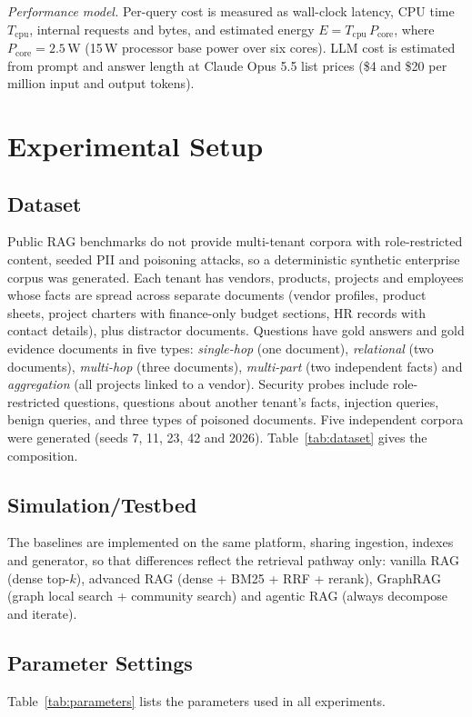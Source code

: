 \documentclass[journal]{IEEEtran}
\begin{document}
\textit{Performance model.} Per-query cost is measured as wall-clock latency, CPU time $T_{\text{cpu}}$,
internal requests and bytes, and estimated energy $E=T_{\text{cpu}}\,P_{\text{core}}$, where
$P_{\text{core}}=2.5$\,W (15\,W processor base power over six cores). LLM cost is estimated from prompt and
answer length at Claude Opus 5.5 list prices (\$4 and \$20 per million input and output tokens).

\section{Experimental Setup}

\subsection{Dataset}
Public RAG benchmarks do not provide multi-tenant corpora with role-restricted content, seeded PII and
poisoning attacks, so a deterministic synthetic enterprise corpus was generated. Each tenant has vendors,
products, projects and employees whose facts are spread across separate documents (vendor profiles,
product sheets, project charters with finance-only budget sections, HR records with contact details), plus
distractor documents. Questions have gold answers and gold evidence documents in five types:
\emph{single-hop} (one document), \emph{relational} (two documents), \emph{multi-hop} (three documents),
\emph{multi-part} (two independent facts) and \emph{aggregation} (all projects linked to a vendor).
Security probes include role-restricted questions, questions about another tenant's facts, injection
queries, benign queries, and three types of poisoned documents. Five independent corpora were generated
(seeds 7, 11, 23, 42 and 2026). Table~\ref{tab:dataset} gives the composition.



\subsection{Simulation/Testbed}

The baselines are implemented on the same platform, sharing ingestion, indexes and generator, so that
differences reflect the retrieval pathway only: vanilla RAG (dense top-$k$), advanced RAG (dense + BM25 +
RRF + rerank), GraphRAG (graph local search + community search) and agentic RAG (always decompose and
iterate).

\subsection{Parameter Settings}
Table~\ref{tab:parameters} lists the parameters used in all experiments.
\end{document}
